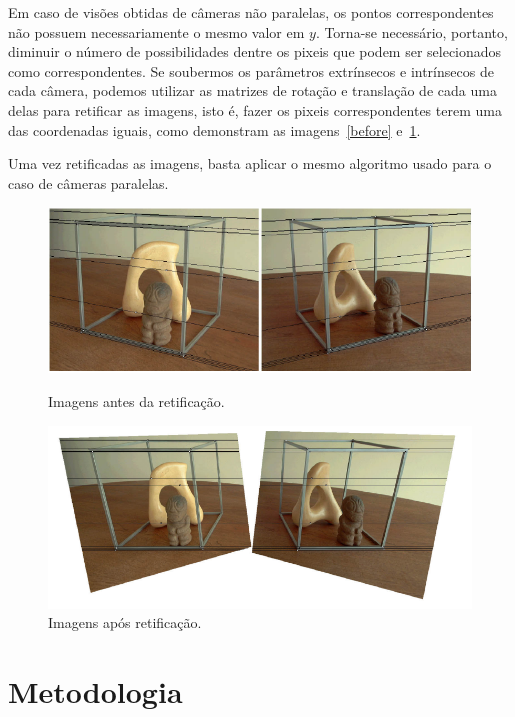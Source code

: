 \documentclass{bmvc2k}
\begin{document}
Em caso de visões obtidas de câmeras não paralelas, os pontos correspondentes não possuem necessariamente o mesmo valor em $y$. Torna-se necessário, portanto, diminuir o número de possibilidades dentre os pixeis que podem ser selecionados como correspondentes. Se soubermos os parâmetros extrínsecos e intrínsecos de cada câmera, podemos utilizar as matrizes de rotação e translação de cada uma delas para retificar as imagens, isto é, fazer os pixeis correspondentes terem uma das coordenadas iguais, como demonstram as imagens~\ref{before} e~\ref{after}.

Uma vez retificadas as imagens, basta aplicar o mesmo algoritmo usado para o caso de câmeras paralelas.

\begin{figure}[htb]
\centering
\begin{minipage}[t]{0.45\textwidth}
  \centering
  \includegraphics[width=\linewidth]{figs/homografphy1.png}
  \caption{Imagens antes da retificação.}
  \label{before}
\end{minipage}\hfill
\begin{minipage}[t]{0.45\textwidth}
  \centering
  \includegraphics[width=\linewidth]{figs/homography2.png}
  \caption{Imagens após retificação.}
  \label{after}
\end{minipage}
\end{figure}


\section{Metodologia}
\label{sec:met}
\end{document}
